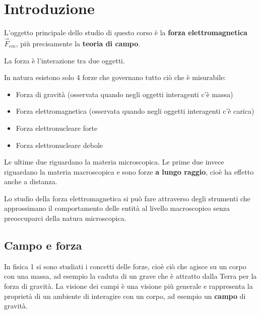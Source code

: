 \documentclass[a4paper]{article}
\begin{document}


\tableofcontents
\pagebreak

\section{Introduzione}
L'oggetto principale dello studio di questo corso è la \textbf{forza elettromagnetica}
\( \vec{F}_{em} \), più precisamente la \textbf{teoria di campo}. 

\begin{define}
  La forza è l'interazione tra due oggetti.
\end{define}

\noindent
In natura esistono solo 4 forze che governano tutto ciò che è
misurabile:
\begin{itemize}
  \item Forza di gravità (osservata quando negli oggetti interagenti c'è massa)
  \item Forza elettromagnetica (osservata quando negli oggetti interagenti c'è carica)
  \item Forza elettronucleare forte
  \item Forza elettronucleare debole
\end{itemize}
Le ultime due riguardano la materia microscopica. Le prime due invece riguardano la
materia macroscopica e sono forze \textbf{a lungo raggio}, cioè ha effetto anche
a distanza.

Lo studio della forza elettromagnetica si può fare attraverso degli strumenti
che approssimano il comportamento delle entità al livello macroscopico senza preoccuparci
della natura microscopica.

\subsection{Campo e forza}
In fisica 1 si sono studiati i concetti delle forze, cioè ciò che agisce su un corpo con
una massa, ad esempio la caduta di un grave che è attratto dalla Terra per la forza di
gravità. La visione dei campi è una visione più generale e rappresenta la proprietà
di un ambiente di interagire con un corpo, ad esempio un \textbf{campo} di gravità.
\end{document}
